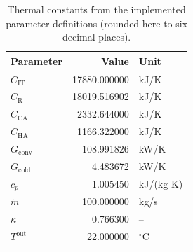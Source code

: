 \begin{table}[htbp]
\centering\small
\caption{Thermal constants from the implemented parameter definitions (rounded here to six decimal places).}\label{tab:thermal}
\begin{tabular}{@{}lrl@{}}\toprule
Parameter & Value & Unit \\\midrule
$C_{\mathrm{IT}}$ & 17880.000000 & kJ/K \\
$C_{\mathrm R}$ & 18019.516902 & kJ/K \\
$C_{\mathrm{CA}}$ & 2332.644000 & kJ/K \\
$C_{\mathrm{HA}}$ & 1166.322000 & kJ/K \\
$G_{\mathrm{conv}}$ & 108.991826 & kW/K \\
$G_{\mathrm{cold}}$ & 4.483672 & kW/K \\
$c_p$ & 1.005450 & kJ/(kg K) \\
$\dot m$ & 100.000000 & kg/s \\
$\kappa$ & 0.766300 & -- \\
$T^{\mathrm{out}}$ & 22.000000 & $^{\circ}$C \\
\bottomrule\end{tabular}
\end{table}
